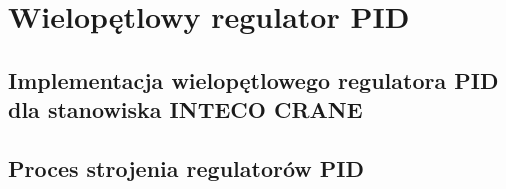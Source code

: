 \chapter{Wielopętlowy regulator PID}
\label{inteco_pid}

\section{Implementacja wielopętlowego regulatora PID dla stanowiska INTECO CRANE}
\label{inteco_impl}

\section{Proces strojenia regulatorów PID}
\label{inteco_strojenie_pid}
